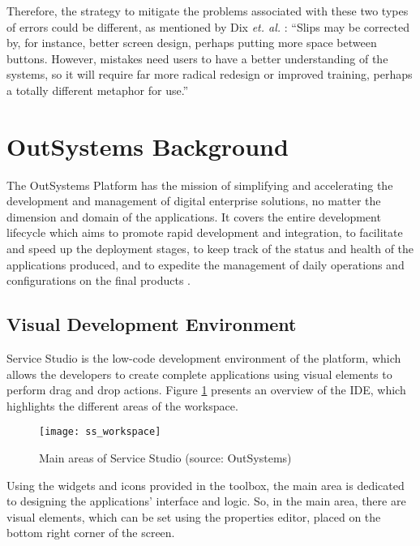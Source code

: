 Therefore, the strategy to mitigate the problems associated with these two types of errors could be different, as mentioned by Dix \textit{et. al.} \cite{humanComputerInteraction}: “Slips may be corrected by, for instance, better screen design, perhaps putting more space between buttons. However, mistakes need users to have a better understanding of the systems, so it will require far more radical redesign or improved training, perhaps a totally different metaphor for use.”


\section{OutSystems Background}
\label{sec:outsystems_background}

The OutSystems Platform has the mission of simplifying and accelerating the development and management of digital enterprise solutions, no matter the dimension and domain of the applications. It covers the entire development lifecycle which aims to promote rapid development and integration, to facilitate and speed up the deployment stages, to keep track of the status and health of the applications produced, and to expedite the management of daily operations and configurations on the final products \cite{eg_developingWithOutsystems}.

\subsection{Visual Development Environment}
\label{subsec:visual_development_environment}

Service Studio is the low-code development environment of the platform, which allows the developers to create complete applications using visual elements to perform drag and drop actions. Figure \ref{fig:ss_workspace} presents an overview of the \gls{IDE}, which highlights the different areas of the workspace.

\begin{figure}[tb]
	\centering
	\texttt{[image: ss\_workspace]}
	\caption{Main areas of Service Studio (source: OutSystems\cite{serviceStudioOverview})}
	\label{fig:ss_workspace}
\end{figure}

Using the widgets and icons provided in the toolbox, the main area is dedicated to designing the applications’ interface and logic. So, in the main area, there are visual elements, which can be set using the properties editor, placed on the bottom right corner of the screen. 

